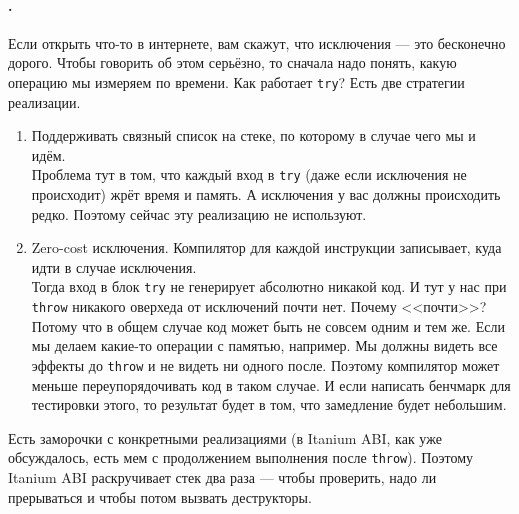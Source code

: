 \documentclass{article}
\begin{document}
    \paragraph{.}
    Если открыть что-то в интернете, вам скажут, что исключения --- это бесконечно дорого. Чтобы говорить об этом серьёзно, то сначала надо понять, какую операцию мы измеряем по времени. Как работает \texttt{try}? Есть две стратегии реализации.
    \begin{enumerate}
        \item Поддерживать связный список на стеке, по которому в случае чего мы и идём.\\
        Проблема тут в том, что каждый вход в \texttt{try} (даже если исключения не происходит) жрёт время и память. А исключения у вас должны происходить редко. Поэтому сейчас эту реализацию не используют.
        \item Zero-cost исключения. Компилятор для каждой инструкции записывает, куда идти в случае исключения.\\
        Тогда вход в блок \texttt{try} не генерирует абсолютно никакой код. И тут у нас при \texttt{throw} никакого оверхеда от исключений почти нет. Почему <<почти>>? Потому что в общем случае код может быть не совсем одним и тем же. Если мы делаем какие-то операции с памятью, например. Мы должны видеть все эффекты до \texttt{throw} и не видеть ни одного после. Поэтому компилятор может меньше переупорядочивать код в таком случае. И если написать бенчмарк для тестировки этого, то результат будет в том, что замедление будет небольшим.
    \end{enumerate}
    Есть заморочки с конкретными реализациями (в Itanium ABI, как уже обсуждалось, есть мем с продолжением выполнения после \texttt{throw}). Поэтому Itanium ABI раскручивает стек два раза --- чтобы проверить, надо ли прерываться и чтобы потом вызвать деструкторы.
\end{document}
